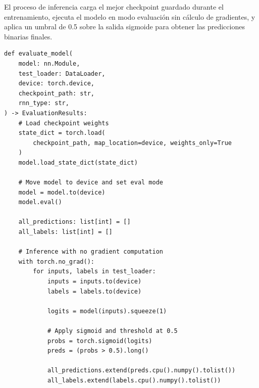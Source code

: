 El proceso de inferencia carga el mejor checkpoint guardado durante el entrenamiento, ejecuta el modelo en modo evaluación sin cálculo de gradientes, y aplica un umbral de 0.5 sobre la salida sigmoide para obtener las predicciones binarias finales.

\begin{verbatim}
def evaluate_model(
    model: nn.Module,
    test_loader: DataLoader,
    device: torch.device,
    checkpoint_path: str,
    rnn_type: str,
) -> EvaluationResults:
    # Load checkpoint weights
    state_dict = torch.load(
        checkpoint_path, map_location=device, weights_only=True
    )
    model.load_state_dict(state_dict)

    # Move model to device and set eval mode
    model = model.to(device)
    model.eval()

    all_predictions: list[int] = []
    all_labels: list[int] = []

    # Inference with no gradient computation
    with torch.no_grad():
        for inputs, labels in test_loader:
            inputs = inputs.to(device)
            labels = labels.to(device)

            logits = model(inputs).squeeze(1)

            # Apply sigmoid and threshold at 0.5
            probs = torch.sigmoid(logits)
            preds = (probs > 0.5).long()

            all_predictions.extend(preds.cpu().numpy().tolist())
            all_labels.extend(labels.cpu().numpy().tolist())
\end{verbatim}

